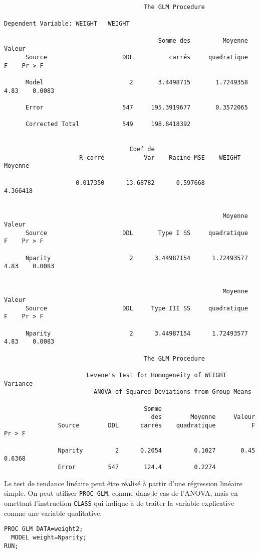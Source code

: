 \begin{verbatim}
                                       The GLM Procedure

Dependent Variable: WEIGHT   WEIGHT

                                           Somme des         Moyenne     Valeur
      Source                     DDL          carrés     quadratique          F    Pr > F

      Model                        2       3.4498715       1.7249358       4.83    0.0083

      Error                      547     195.3919677       0.3572065

      Corrected Total            549     198.8418392


                                   Coef de
                     R-carré           Var    Racine MSE    WEIGHT Moyenne

                    0.017350      13.68782      0.597668          4.366418


                                                             Moyenne     Valeur
      Source                     DDL       Type I SS     quadratique          F    Pr > F

      Nparity                      2      3.44987154      1.72493577       4.83    0.0083


                                                             Moyenne     Valeur
      Source                     DDL     Type III SS     quadratique          F    Pr > F

      Nparity                      2      3.44987154      1.72493577       4.83    0.0083

                                       The GLM Procedure

                       Levene's Test for Homogeneity of WEIGHT Variance
                         ANOVA of Squared Deviations from Group Means

                                       Somme
                                         des        Moyenne     Valeur
               Source        DDL      carrés    quadratique          F    Pr > F

               Nparity         2      0.2054         0.1027       0.45    0.6368
               Error         547       124.4         0.2274
\end{verbatim}

Le test de tendance linéaire peut être réalisé à partir d'une régression
linéaire simple. On peut utiliser \texttt{PROC GLM}, comme dans le cas de
l'ANOVA, mais en omettant l'instruction \texttt{CLASS} qui indique à \SAS de
traiter la variable explicative comme une variable qualitative.
\begin{verbatim}
PROC GLM DATA=weight2;  
  MODEL weight=Nparity;
RUN;
\end{verbatim}

